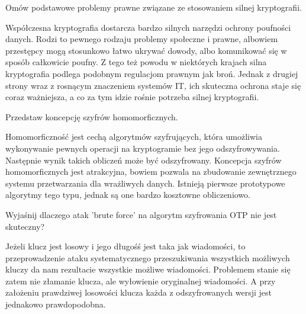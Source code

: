 \documentclass[answers,11pt]{exam}
\begin{document}
\begin{questions}
\question Omów podstawowe problemy prawne związane ze stosowaniem silnej kryptografii.
\begin{solution}
Współczesna kryptografia dostarcza bardzo silnych narzędzi ochrony poufności danych. Rodzi to pewnego rodzaju problemy społeczne i prawne, albowiem przestępcy mogą stosunkowo łatwo ukrywać dowody, albo komunikować się w sposób całkowicie poufny. Z tego też powodu w niektórych krajach silna kryptografia podlega podobnym regulacjom prawnym jak broń. Jednak z drugiej strony wraz z rosnącym znaczeniem systemów IT, ich skuteczna ochrona staje się coraz ważniejsza, a co za tym idzie rośnie potrzeba silnej kryptografii.
\end{solution}

\question Przedstaw koncepcję szyfrów homomorficznych.
\begin{solution}
Homomorficzność jest cechą algorytmów szyfrujących, która umożliwia wykonywanie pewnych operacji na kryptogramie bez jego odszyfrowywania. Następnie wynik takich obliczeń może być  odszyfrowany. Koncepcja szyfrów homomorficznych jest atrakcyjna, bowiem pozwala na zbudowanie zewnętrznego systemu przetwarzania dla wrażliwych danych. Istnieją pierwsze prototypowe algorytmy tego typu, jednak są one bardzo kosztowne obliczeniowo.
\end{solution}

\question Wyjaśnij dlaczego atak 'brute force' na algorytm szyfrowania OTP nie jest skuteczny?
\begin{solution}
Jeżeli klucz jest losowy i jego długośś jest taka jak wiadomości, to przeprowadzenie ataku systematycznego przeszukiwania wszystkich możliwych kluczy da nam rezultacie wszystkie możliwe wiadomości. Problemem stanie się zatem nie złamanie klucza, ale wyłowienie oryginalnej wiadomości. A przy założeniu prawdziwej losowości klucza każda z odszyfrowanych wersji jest jednakowo prawdopodobna.
\end{solution}


\end{questions}
\end{document}
